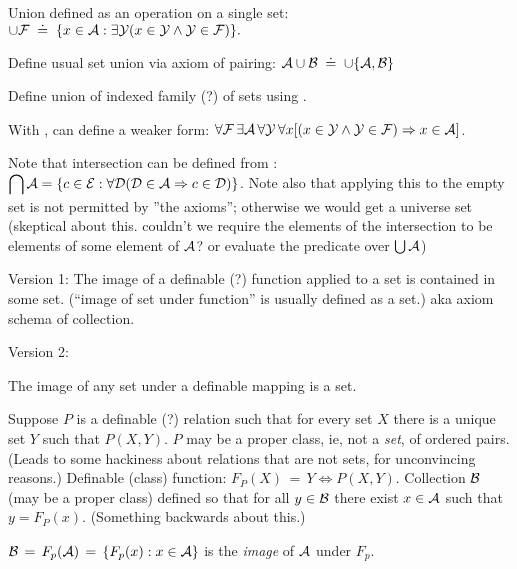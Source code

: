 Union defined as an operation on a single set:\hfill\break
${\displaystyle 
\cup {\ensuremath{\mathcal{F}}} \; \doteq \;
\{x\in \mathcal{A}:\exists \mathcal{Y} 
(x \in \mathcal{Y} \land \mathcal{Y} \in \mathcal{F})\}.}$

Define usual set union via axiom of pairing:
$\mathcal{A} \cup \mathcal{B} \; \doteq \; \cup \{ \mathcal{A}, \mathcal{B}\}$

Define union of indexed family (?) of sets
using .

With ,
can define a weaker form:
$\forall {\ensuremath{\mathcal{F}}}\,\exists \mathcal{A}\,\forall \mathcal{Y}\,
\forall x
[(x\in \mathcal{Y} 
\land 
\mathcal{Y}\in {\ensuremath{\mathcal{F}}})
\Rightarrow 
x\in \mathcal{A}]$.

Note that intersection can be defined from 
:\hfill\linebreak
${\displaystyle 
\bigcap \mathcal{A}=\{c\in \mathcal{E}:
\forall \mathcal{D} (\mathcal{D} \in \mathcal{A} \Rightarrow c\in \mathcal{D})\}}$.
Note also that applying this to the empty set
is not permitted by ''the axioms'';
otherwise we would get a universe set 
(skeptical about this.
couldn't we require the elements of the intersection
to be elements of some element of $\mathcal{A}$?
or evaluate the predicate over $\bigcup \mathcal{A}$)

\label{sec:Axiom-schema-of-replacement}

Version 1: 
The image of a definable (?) function applied to a set
is contained in some set.\cite{wiki:Axiom_schema_of_replacement}
(``image of set under function'' is usually defined as a set.)
aka axiom schema of collection.

Version 2: 

The image of any set under a definable mapping is a set.

Suppose $P$ is a definable (?) relation such that for every
set $X$ there is a unique set $Y$ such that $P(X,Y)$.
$P$ may be a proper class\cite{wiki:Class_set_theory}, 
ie, not a \textit{set}, of ordered pairs. 
(Leads to some hackiness about relations that are not sets,
for unconvincing reasons\cite{wiki:Binary_relation}.)
Definable (class) function: $F_P(X)\,=\,Y \iff P(X,Y)$.
Collection $\mathcal{B}$ (may be a proper class)
defined so that for all $y\in\mathcal{B}$ there exist $x \in \mathcal{A}$
such that $y=F_P(x)$.
(Something backwards about this.)

$\mathcal{B}\,=\,F_p(\mathcal{A}) \,=\, \{F_p(x) : x \in \mathcal{A}\}$ 
is the \textsl{image} of $\mathcal{A}$ under $F_p$.

